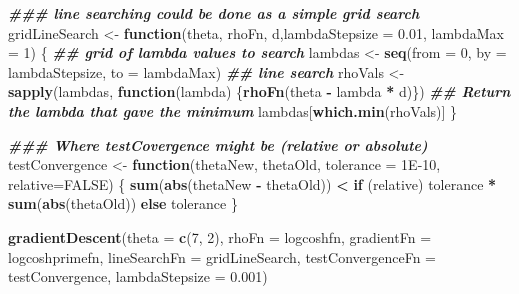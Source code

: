 \documentclass[
]{article}
\newenvironment{Shaded}{\begin{snugshade}}{\end{snugshade}}
\newcommand{\AttributeTok}[1]{\textcolor[rgb]{0.13,0.29,0.53}{#1}}
\newcommand{\ConstantTok}[1]{\textcolor[rgb]{0.56,0.35,0.01}{#1}}
\newcommand{\ControlFlowTok}[1]{\textcolor[rgb]{0.13,0.29,0.53}{\textbf{#1}}}
\newcommand{\DecValTok}[1]{\textcolor[rgb]{0.00,0.00,0.81}{#1}}
\newcommand{\DocumentationTok}[1]{\textcolor[rgb]{0.56,0.35,0.01}{\textbf{\textit{#1}}}}
\newcommand{\FloatTok}[1]{\textcolor[rgb]{0.00,0.00,0.81}{#1}}
\newcommand{\FunctionTok}[1]{\textcolor[rgb]{0.13,0.29,0.53}{\textbf{#1}}}
\newcommand{\NormalTok}[1]{#1}
\newcommand{\OtherTok}[1]{\textcolor[rgb]{0.56,0.35,0.01}{#1}}
\newcommand{\SpecialCharTok}[1]{\textcolor[rgb]{0.81,0.36,0.00}{\textbf{#1}}}
\begin{document}
\begin{Shaded}
\begin{Highlighting}[]
\DocumentationTok{\#\#\# line searching could be done as a simple grid search}
\NormalTok{gridLineSearch }\OtherTok{\textless{}{-}} \ControlFlowTok{function}\NormalTok{(theta, rhoFn, d,}\AttributeTok{lambdaStepsize =} \FloatTok{0.01}\NormalTok{, }\AttributeTok{lambdaMax =} \DecValTok{1}\NormalTok{) \{}
  \DocumentationTok{\#\# grid of lambda values to search}
\NormalTok{  lambdas }\OtherTok{\textless{}{-}} \FunctionTok{seq}\NormalTok{(}\AttributeTok{from =} \DecValTok{0}\NormalTok{, }\AttributeTok{by =}\NormalTok{ lambdaStepsize,  }\AttributeTok{to =}\NormalTok{ lambdaMax)}
  \DocumentationTok{\#\# line search}
\NormalTok{  rhoVals }\OtherTok{\textless{}{-}} \FunctionTok{sapply}\NormalTok{(lambdas, }\ControlFlowTok{function}\NormalTok{(lambda) \{}\FunctionTok{rhoFn}\NormalTok{(theta }\SpecialCharTok{{-}}\NormalTok{ lambda }\SpecialCharTok{*}\NormalTok{ d)\})}
  \DocumentationTok{\#\# Return the lambda that gave the minimum}
\NormalTok{  lambdas[}\FunctionTok{which.min}\NormalTok{(rhoVals)]}
\NormalTok{\}}
\end{Highlighting}
\end{Shaded}

\begin{Shaded}
\begin{Highlighting}[]
\DocumentationTok{\#\#\# Where testCovergence might be (relative or absolute)}
\NormalTok{testConvergence }\OtherTok{\textless{}{-}} \ControlFlowTok{function}\NormalTok{(thetaNew, thetaOld, }\AttributeTok{tolerance =} \FloatTok{1E{-}10}\NormalTok{, }\AttributeTok{relative=}\ConstantTok{FALSE}\NormalTok{) \{}
   \FunctionTok{sum}\NormalTok{(}\FunctionTok{abs}\NormalTok{(thetaNew }\SpecialCharTok{{-}}\NormalTok{ thetaOld)) }\SpecialCharTok{\textless{}} \ControlFlowTok{if}\NormalTok{ (relative) tolerance }\SpecialCharTok{*} \FunctionTok{sum}\NormalTok{(}\FunctionTok{abs}\NormalTok{(thetaOld)) }\ControlFlowTok{else}\NormalTok{ tolerance}
\NormalTok{\}}
\end{Highlighting}
\end{Shaded}

\begin{Shaded}
\begin{Highlighting}[]
\FunctionTok{gradientDescent}\NormalTok{(}\AttributeTok{theta =} \FunctionTok{c}\NormalTok{(}\DecValTok{7}\NormalTok{, }\DecValTok{2}\NormalTok{), }\AttributeTok{rhoFn =}\NormalTok{ logcoshfn, }\AttributeTok{gradientFn =}\NormalTok{ logcoshprimefn, }
                \AttributeTok{lineSearchFn =}\NormalTok{ gridLineSearch, }\AttributeTok{testConvergenceFn =}\NormalTok{ testConvergence, }
                \AttributeTok{lambdaStepsize =} \FloatTok{0.001}\NormalTok{)}
\end{Highlighting}
\end{Shaded}
\end{document}
